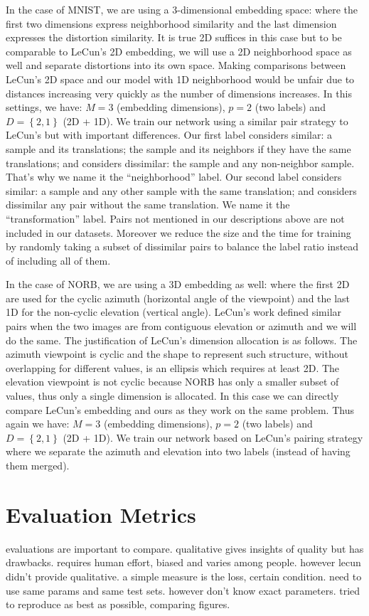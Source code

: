 \documentclass[a4paper,12pt]{report}
\begin{document}
In the case of MNIST, we are using a 3-dimensional embedding space: where the first two dimensions express neighborhood similarity and the last dimension expresses the distortion similarity.
It is true 2D suffices in this case but to be comparable to LeCun's 2D embedding, we will use a 2D neighborhood space as well and separate distortions into its own space.
Making comparisons between LeCun's 2D space and our model with 1D neighborhood would be unfair due to distances increasing very quickly as the number of dimensions increases.
In this settings, we have: $M=3$ (embedding dimensions), $p = 2$ (two labels) and $D = \left\{ 2, 1 \right\}$ (2D + 1D).
We train our network using a similar pair strategy to LeCun's but with important differences.
Our first label considers similar: a sample and its translations; the sample and its neighbors if they have the same translations; and considers dissimilar: the sample and any non-neighbor sample.
That's why we name it the ``neighborhood'' label.
Our second label considers similar: a sample and any other sample with the same translation; and considers dissimilar any pair without the same translation.
We name it the ``transformation'' label.
Pairs not mentioned in our descriptions above are not included in our datasets.
Moreover we reduce the size and the time for training by randomly taking a subset of dissimilar pairs to balance the label ratio instead of including all of them.

In the case of NORB, we are using a 3D embedding as well: where the first 2D are used for the cyclic azimuth (horizontal angle of the viewpoint) and the last 1D for the non-cyclic elevation (vertical angle).
LeCun's work defined similar pairs when the two images are from contiguous elevation or azimuth and we will do the same.
The justification of LeCun's dimension allocation is as follows.
The azimuth viewpoint is cyclic and the shape to represent such structure, without overlapping for different values, is an ellipsis which requires at least 2D.
The elevation viewpoint is not cyclic because NORB has only a smaller subset of values, thus only a single dimension is allocated.
In this case we can directly compare LeCun's embedding and ours as they work on the same problem.
Thus again we have: $M=3$ (embedding dimensions), $p = 2$ (two labels) and $D = \left\{ 2, 1 \right\}$ (2D + 1D).
We train our network based on LeCun's pairing strategy where we separate the azimuth and elevation into two labels (instead of having them merged).

\section{Evaluation Metrics}
evaluations are important to compare.
qualitative gives insights of quality but has drawbacks.
requires human effort, biased and varies among people.
however lecun didn't provide qualitative.
a simple measure is the loss, certain condition.
need to use same params and same test sets.
however don't know exact parameters.
tried to reproduce as best as possible, comparing figures.
\end{document}
